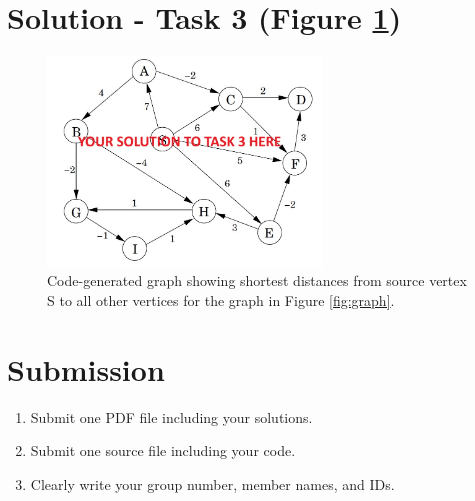 \documentclass[a4paper]{article}
\begin{document}
\clearpage
\section*{Solution - Task 3 (Figure \ref{fig:graph-task3})}
\begin{figure}[h!]
    \centering
    \includegraphics[width=0.65\textwidth]{graph-task3.jpg}
    \caption{Code-generated graph showing shortest distances from source vertex S to all other vertices for the graph in Figure \ref{fig:graph}.}
    \label{fig:graph-task3}
\end{figure}

\clearpage %

\section*{Submission}
\begin{enumerate}
    \item Submit one PDF file including your solutions. 
    \item Submit one source file including your code. 
    \item Clearly write your group number, member names, and IDs. 
\end{enumerate}
\end{document}
